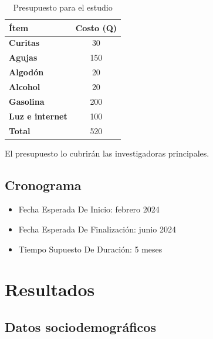 \documentclass[jou]{apa7}
\begin{document}
	\begin{table}[H]
		\centering
		\begin{tabular}{>{\bfseries}l c}
			\toprule
			Ítem & Costo (Q) \\
			
			\midrule
			Curitas & 30 \\
			
			Agujas & 150 \\
			
			Algodón & 20 \\
			
			Alcohol & 20 \\
			
			Gasolina & 200 \\
			
			Luz e internet & 100 \\
			
			\midrule
			Total & 520 \\
			
			\bottomrule
		\end{tabular}
		\caption{Presupuesto para el estudio}
		\label{tab:presupuesto}
	\end{table}
	
	
	
	El presupuesto lo cubrirán las investigadoras principales.
	
	\subsection{Cronograma}\label{cronograma}
	
	\begin{itemize}
		
		\item
		Fecha Esperada De Inicio: febrero 2024\\
		
		\item
		Fecha Esperada De Finalización: junio 2024\\
		
		\item
		Tiempo Supuesto De Duración: 5 meses
	\end{itemize}
	
	\section{Resultados}\label{resultados}
	
	\subsection{Datos sociodemográficos}
	
\end{document}

